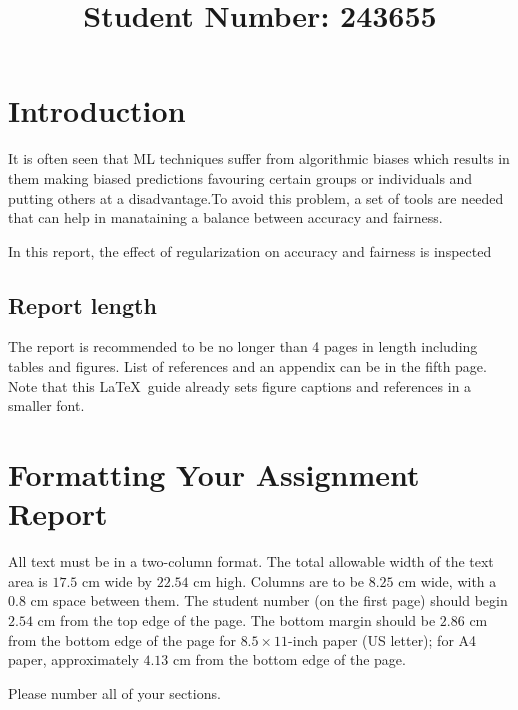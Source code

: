 \documentclass[10pt,twocolumn,letterpaper]{article}
\begin{document}
\title{Student Number: 243655}  %

\maketitle
\thispagestyle{empty}


\section{Introduction}

It is often seen that ML techniques suffer from algorithmic biases which results in them making biased predictions favouring certain groups or individuals and putting others at a disadvantage.To avoid this problem, a set of tools are needed that can help in manataining a balance between accuracy and fairness.

In this report, the effect of regularization on accuracy and fairness is inspected  


\subsection{Report length}
The report is recommended to be no longer than 4 pages in length including tables and figures. List of references and an appendix can be in the fifth page. Note that this \LaTeX\ guide already sets figure captions and references in a smaller font.

\section{Formatting Your Assignment Report}

All text must be in a two-column format. The total allowable width of the text area is $17.5$ cm wide by $22.54$ cm high. Columns are to be $8.25$ cm wide, with a $0.8$ cm space between them. The student number (on the first page) should begin $2.54$ cm from the top edge of the page.  The bottom margin should be $2.86$ cm from the bottom edge of the page for $8.5 \times 11$-inch paper (US letter); for A4 paper, approximately $4.13$ cm from the bottom edge of the page.

Please number all of your sections.
\end{document}
